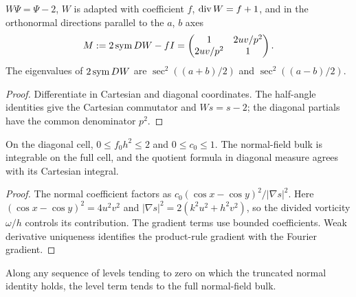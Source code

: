 \begin{lemma}
\label{lem:mixed-field-algebra}
\leanok
$W\Psi=\Psi-2$, $W$ is adapted with coefficient $f$, $\operatorname{div} W=f+1$, and in the
orthonormal directions parallel to the $a$, $b$ axes
\[
  M:=2\operatorname{sym} DW-fI=\begin{pmatrix}1&2uv/p^2\\2uv/p^2&1\end{pmatrix}.
\]
The eigenvalues of $2\operatorname{sym} DW$ are $\sec^2((a+b)/2)$ and $\sec^2((a-b)/2)$.
\end{lemma}

\begin{proof}
\leanok
Differentiate in Cartesian and diagonal coordinates. The half-angle
identities give the Cartesian commutator and $Ws=s-2$; the diagonal
partials have the common denominator $p^2$.
\end{proof}

\begin{lemma}
\label{lem:mixed-normal-bulk}
\leanok
On the diagonal cell, $0\le f_0 h^2\le 2$ and $0\le c_0\le 1$.
The normal-field bulk is integrable on the full cell, and the quotient
formula in diagonal measure agrees with its Cartesian integral.
\end{lemma}

\begin{proof}
\leanok
The normal coefficient factors as $c_0(\cos x-\cos y)^2/|\nabla s|^2$.
Here $(\cos x-\cos y)^2=4u^2v^2$ and $|\nabla s|^2=2(k^2u^2+h^2v^2)$,
so the divided vorticity $\omega/h$ controls its contribution.
The gradient terms use bounded coefficients. Weak derivative uniqueness
identifies the product-rule gradient with the Fourier gradient.
\end{proof}

\begin{lemma}
\label{lem:mixed-normal-level-limit}
\leanok
Along any sequence of levels tending to zero on which the truncated
normal identity holds, the level term tends to the full normal-field bulk.
\end{lemma}

